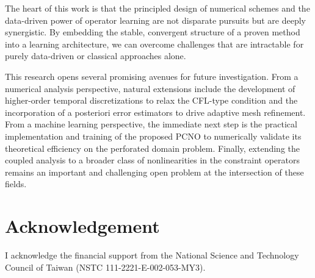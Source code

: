 \documentclass[pdflatex,sn-mathphys-num]{sn-jnl}%
\theoremstyle{thmstyleone}%
\numberwithin{equation}{section}
\begin{document}
The heart of this work is that the principled design of numerical schemes and the data-driven power of operator learning are not disparate pursuits but are deeply synergistic. By embedding the stable, convergent structure of a proven method into a learning architecture, we can overcome challenges that are intractable for purely data-driven or classical approaches alone.

This research opens several promising avenues for future investigation. From a numerical analysis perspective, natural extensions include the development of higher-order temporal discretizations to relax the CFL-type condition and the incorporation of a posteriori error estimators to drive adaptive mesh refinement. From a machine learning perspective, the immediate next step is the practical implementation and training of the proposed PCNO to numerically validate its theoretical efficiency on the perforated domain problem. Finally, extending the coupled analysis to a broader class of nonlinearities in the constraint operators remains an important and challenging open problem at the intersection of these fields.

\section*{Acknowledgement}
I acknowledge the financial support from the National Science and Technology Council of Taiwan (NSTC 111-2221-E-002-053-MY3).

\end{document}
